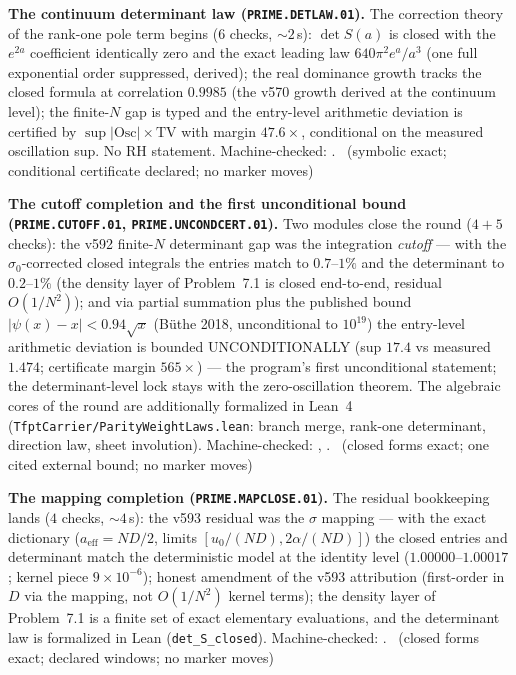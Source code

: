 \documentclass[11pt,a4paper]{article}
\theoremstyle{definition}
\begin{document}
\par\smallskip\noindent\textbf{The continuum determinant law
(\texttt{PRIME.DETLAW.01}).}
The correction theory of the rank-one pole term begins ($6$ checks,
${\sim}2$\,s): $\det S(a)$ is closed with the $e^{2a}$ coefficient
identically zero and the exact leading law $640\pi^2e^a/a^3$ (one full
exponential order suppressed, derived); the real dominance growth
tracks the closed formula at correlation $0.9985$ (the v570 growth
derived at the continuum level); the finite-$N$ gap is typed and the
entry-level arithmetic deviation is certified by
$\sup|\mathrm{Osc}|\times\mathrm{TV}$ with margin $47.6\times$,
conditional on the measured oscillation sup.  No RH statement.
Machine-checked: .
\mE\ (symbolic exact; conditional certificate declared; no marker
moves)
\par\smallskip

\par\smallskip\noindent\textbf{The cutoff completion and the first
unconditional bound (\texttt{PRIME.CUTOFF.01},
\texttt{PRIME.UNCONDCERT.01}).}
Two modules close the round ($4+5$ checks): the v592 finite-$N$
determinant gap was the integration \emph{cutoff} --- with the
$\sigma_0$-corrected closed integrals the entries match to
$0.7$--$1\%$ and the determinant to $0.2$--$1\%$ (the density layer of
Problem~7.1 is closed end-to-end, residual $O(1/N^2)$); and via
partial summation plus the published bound
$|\psi(x)-x|<0.94\sqrt{x}$ (B\"uthe 2018, unconditional to
$10^{19}$) the entry-level arithmetic deviation is bounded
UNCONDITIONALLY (sup $17.4$ vs measured $1.474$; certificate margin
$565\times$) --- the program's first unconditional statement; the
determinant-level lock stays with the zero-oscillation theorem.  The
algebraic cores of the round are additionally formalized in Lean~4
(\texttt{TfptCarrier/ParityWeightLaws.lean}: branch merge, rank-one
determinant, direction law, sheet involution).  Machine-checked:
,
.
\mE\ (closed forms exact; one cited external bound; no marker moves)
\par\smallskip

\par\smallskip\noindent\textbf{The mapping completion
(\texttt{PRIME.MAPCLOSE.01}).}
The residual bookkeeping lands ($4$ checks, ${\sim}4$\,s): the v593
residual was the $\sigma$ mapping --- with the exact dictionary
($a_{\mathrm{eff}}=ND/2$, limits $[u_0/(ND),2\alpha/(ND)]$) the closed
entries and determinant match the deterministic model at the identity
level ($1.00000$--$1.00017$; kernel piece $9\times10^{-6}$); honest
amendment of the v593 attribution (first-order in $D$ via the mapping,
not $O(1/N^2)$ kernel terms); the density layer of Problem~7.1 is a
finite set of exact elementary evaluations, and the determinant law is
formalized in Lean (\texttt{det\_S\_closed}).  Machine-checked:
.
\mE\ (closed forms exact; declared windows; no marker moves)
\par\smallskip
\end{document}
